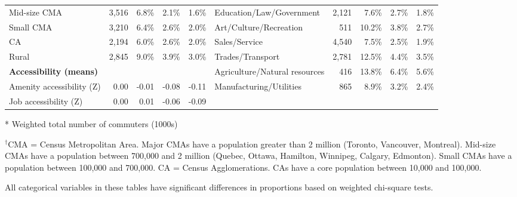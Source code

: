\documentclass[10 pt,letterpaper]{article}
\begin{document}
\begin{table}[H]
{\begin{tabular}{lrrrrlrrrr}
			Mid-size CMA                   & 3,516  & 6.8\%       & 2.1\%      & 1.6\%      & Education/Law/Government          & 2,121 & 7.6\%       & 2.7\%       & 1.8\%     \\
			Small CMA                      & 3,210  & 6.4\%       & 2.6\%      & 2.0\%      & Art/Culture/Recreation            & 511   & 10.2\%      & 3.8\%       & 2.7\%     \\
			CA                             & 2,194  & 6.0\%       & 2.6\%      & 2.0\%      & Sales/Service                     & 4,540 & 7.5\%       & 2.5\%       & 1.9\%     \\
			Rural                          & 2,845  & 9.0\%       & 3.9\%      & 3.0\%      & Trades/Transport                  & 2,781 & 12.5\%      & 4.4\%       & 3.5\%     \\
			\textbf{Accessibility (means)} &        &             &            &            & Agriculture/Natural resources     & 416   & 13.8\%      & 6.4\%       & 5.6\%     \\
			Amenity accessibility (Z)      & 0.00   & -0.01       & -0.08      & -0.11      & Manufacturing/Utilities           & 865   & 8.9\%       & 3.2\%       & 2.4\%     \\
			Job accessibility (Z)          & 0.00   & 0.01        & -0.06      & -0.09      &                                   &       &             &             &          
			
			\\ \hline   
		\end{tabular}
	
}

\label{tab:summary_p2}

\vspace{1mm}

\footnotesize

* Weighted total number of commuters (1000s)

\vspace{1mm}


$^\dagger$CMA = Census Metropolitan Area. Major CMAs have a population greater than 2 million (Toronto, Vancouver, Montreal). Mid-size CMAs have a population between 700,000 and 2 million (Quebec, Ottawa, Hamilton, Winnipeg, Calgary, Edmonton). Small CMAs have a population between 100,000 and 700,000. CA = Census Agglomerations. CAs have a core population between 10,000 and 100,000.

\vspace{1mm}
	
	All categorical variables in these tables have significant differences in proportions based on weighted chi-square tests. 

\vspace{4.2mm}

\normalsize      


\end{table}
\end{document}
